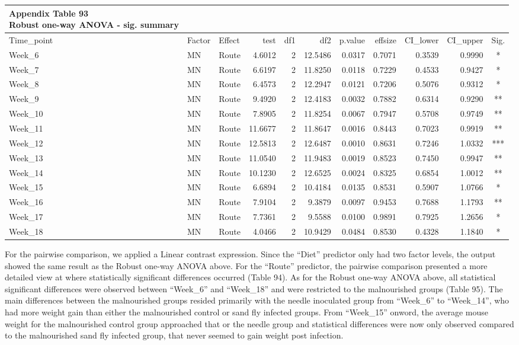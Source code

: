 \documentclass[
  12pt,
  letterpaper,
]{article}
\begin{document}
\begin{longtable}{lllrrrrrrrc}
\caption*{
{\large \textbf{Appendix Table 93}} \\ 
{\small \textbf{Robust one-way ANOVA - sig. summary}}
} \\ 
\toprule
Time\_point & Factor & Effect & test & df1 & df2 & p.value & effsize & CI\_lower & CI\_upper & Sig. \\ 
\midrule\addlinespace[2.5pt]
Week\_6 & MN & Route & 4.6012 & 2 & 12.5486 & 0.0317 & 0.7071 & 0.3539 & 0.9990 & * \\ 
Week\_7 & MN & Route & 6.6197 & 2 & 11.8250 & 0.0118 & 0.7229 & 0.4533 & 0.9427 & * \\ 
Week\_8 & MN & Route & 6.4573 & 2 & 12.2947 & 0.0121 & 0.7206 & 0.5076 & 0.9312 & * \\ 
Week\_9 & MN & Route & 9.4920 & 2 & 12.4183 & 0.0032 & 0.7882 & 0.6314 & 0.9290 & ** \\ 
Week\_10 & MN & Route & 7.8905 & 2 & 11.8254 & 0.0067 & 0.7947 & 0.5708 & 0.9749 & ** \\ 
Week\_11 & MN & Route & 11.6677 & 2 & 11.8647 & 0.0016 & 0.8443 & 0.7023 & 0.9919 & ** \\ 
Week\_12 & MN & Route & 12.5813 & 2 & 12.6487 & 0.0010 & 0.8631 & 0.7246 & 1.0332 & *** \\ 
Week\_13 & MN & Route & 11.0540 & 2 & 11.9483 & 0.0019 & 0.8523 & 0.7450 & 0.9947 & ** \\ 
Week\_14 & MN & Route & 10.1230 & 2 & 12.6525 & 0.0024 & 0.8325 & 0.6854 & 1.0012 & ** \\ 
Week\_15 & MN & Route & 6.6894 & 2 & 10.4184 & 0.0135 & 0.8531 & 0.5907 & 1.0766 & * \\ 
Week\_16 & MN & Route & 7.9104 & 2 & 9.3879 & 0.0097 & 0.9453 & 0.7688 & 1.1793 & ** \\ 
Week\_17 & MN & Route & 7.7361 & 2 & 9.5588 & 0.0100 & 0.9891 & 0.7925 & 1.2656 & * \\ 
Week\_18 & MN & Route & 4.0466 & 2 & 10.9429 & 0.0484 & 0.8530 & 0.4328 & 1.1840 & * \\ 
\bottomrule
\end{longtable}

For the pairwise comparison, we applied a Linear contrast expression. Since the ``Diet'' predictor only had two factor levels, the output showed the same result as the Robust one-way ANOVA above. For the ``Route'' predictor, the pairwise comparison presented a more detailed view at where statistically significant differences occurred (Table 94). As for the Robust one-way ANOVA above, all statistical significant differences were observed between ``Week\_6'' and ``Week\_18'' and were restricted to the malnourished groups (Table 95). The main differences between the malnourished groups resided primarily with the needle inoculated group from ``Week\_6'' to ``Week\_14'', who had more weight gain than either the malnourished control or sand fly infected groups. From ``Week\_15'' onword, the average mouse weight for the malnourished control group approached that or the needle group and statistical differences were now only observed compared to the malnourished sand fly infected group, that never seemed to gain weight post infection.
\end{document}
